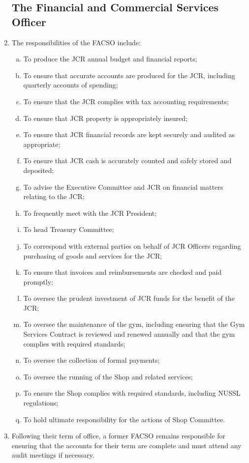 \documentclass[12pt]{article}  %
\begin{document}
\begin{enumerate}
    \subsection{The Financial and Commercial Services Officer}
    \item The responsibilities of the FACSO include:
    \begin{enumerate}[(a)]
        \item To produce the JCR annual budget and financial reports;
        \item To ensure that accurate accounts are produced for the JCR, including quarterly accounts of spending;
        \item To ensure that the JCR complies with tax accounting requirements;
        \item To ensure that JCR property is appropriately insured;
        \item To ensure that JCR financial records are kept securely and audited as appropriate;
        \item To ensure that JCR cash is accurately counted and safely stored and deposited;
        \item To advise the Executive Committee and JCR on financial matters relating to the JCR;
        \item To frequently meet with the JCR President;
        \item To head Treasury Committee;
        \item To correspond with external parties on behalf of JCR Officers regarding purchasing of goods and services for the JCR;
        \item To ensure that invoices and reimbursements are checked and paid promptly;
        \item To oversee the prudent investment of JCR funds for the benefit of the JCR;
        \item To oversee the maintenance of the gym, including ensuring that the Gym Services Contract is reviewed and renewed annually and that the gym complies with required standards;
        \item To oversee the collection of formal payments;
        \item To oversee the running of the Shop and related services;
        \item To ensure the Shop complies with required standards, including NUSSL regulations;
        \item To hold ultimate responsibility for the actions of Shop Committee.
    \end{enumerate}
    \item Following their term of office, a former FACSO remains responsible for ensuring that the accounts for their term are complete and must attend any audit meetings if necessary.

\end{enumerate}
\end{document}
